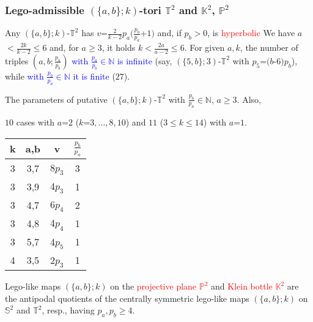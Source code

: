 \documentclass{beamer}
\begin{document}
\begin{frame}\frametitle{Lego-admissible   $(\{a,b\}; k)$-tori $\mathbb{T}^2$ 
 and $\mathbb{K}^2$,   
 $\mathbb{P}^2$}
\vspace{-2mm}
Any 
$(\{a,b\};k)$-$\mathbb{T}^2$ has $v$=$\frac{2}{k-2}p_a(\frac{p_b}{p_a}$+$1)$ and, if $p_b$$>$$0$, is \textcolor{red}{hyperbolic}
We have $a$$<$$\frac{2k}{k-2}$$\le 6$ and, for $a$$\ge$$ 3$, it holds $k$$<$$\frac{2a}{a-2}\le 6$. 
For  given $a,k$,  
 the number of triples $(a,b; \frac{p_a}{p_b})$ \textcolor{blue}{with  
$ \frac{p_a}{p_b}$$\in$$ \mathbb{N}$ is infinite} (say, $(\{5,b\};3)$-$\mathbb{T}^2$ with $p_5$=$(b$-$6)p_b$), while 
\textcolor{blue}{with  
$ \frac{p_b}{p_a}$$\in$$ \mathbb{N}$   it   is finite} ($27$).
 
 
 
\begin{table}
The  parameters of putative
$(\{a,b\};k)$-$\mathbb{T}^2$
 with $\frac{p_b}{p_a}$$\in $$ \mathbb{N}$, $a\ge 3$. Also, 
 
 $10$ cases with $a$=$2$ ($k$=$3,\dots ,8, 10$) and $11$ ($3$$\le$$k$$\le$$14$) with $a$=$1$.
\label{LegoAdm3}
\begin{center}
\scriptsize
\begin{tabular}{||c|c|c|c||}
\hline\hline
k&a,b&v&$\frac{p_b}{p_a}$\\
\hline
 \hline
    3&3,7&8$p_3$&3\\
  3&3,9&4$p_3$&1\\
  3&4,7&6$p_4$&2\\  
   3&4,8&4$p_4$&1\\  
 3&5,7&4$p_5$&1\\
 4&3,5&2$p_3$&1\\\hline\hline
 \end{tabular}
\end{center}
\end{table}
 
Lego-like maps $(\{a,b\};k)$ on the \textcolor{red}{projective plane $\mathbb{P}^2$} 
and \textcolor{red}{Klein bottle $\mathbb{K}^2$} are the antipodal quotients of the
centrally symmetric lego-like maps  $(\{a,b\};k)$
 on  $\mathbb{S}^2$ and 
 $\mathbb{T}^2$, resp.,
 having $p_a, p_b\ge 4$.

\end{frame}
\end{document}
